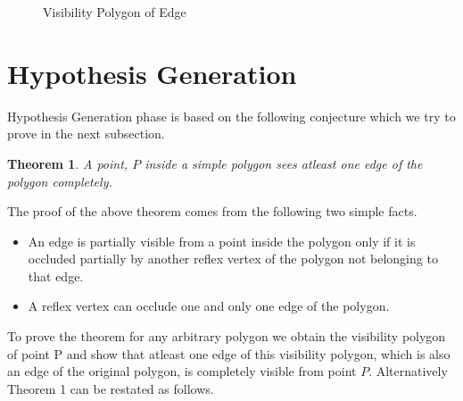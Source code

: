 \documentclass[a4paper,10pt]{article}
\newtheorem{theorem}{Theorem}
\begin{document}
\begin{figure}[h]
\begin{center}
\caption{\label{fig:Visibility Polygon of Edge}Visibility Polygon of Edge}
\end{center}
\end{figure}


















\newpage
\section{Hypothesis Generation}
Hypothesis Generation phase is based on the following conjecture which we try to prove in the next subsection.

\begin{theorem}
 A point, $P$ inside a simple polygon sees atleast one edge of the polygon completely.
\end{theorem}
The proof of the above theorem comes from the following two simple facts.
\begin{itemize}
 \item An edge is partially visible from a point inside the polygon only if it is occluded partially by another reflex vertex of the polygon
not belonging to that edge.
\item A reflex vertex can occlude one and only one edge of the polygon.
\end{itemize}

To prove the theorem for any arbitrary polygon we obtain the visibility polygon of point P and show that atleast one edge of this
visibility polygon, which is also an edge of the original polygon, is completely visible from point $P$. Alternatively Theorem 1 can be
 restated as follows.
\end{document}
